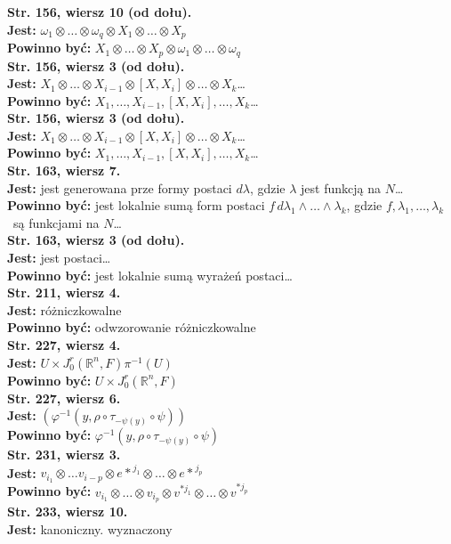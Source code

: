\documentclass[a4paper,11pt]{article}
\newcommand{\mb}{\mathbb}
\newcommand{\ld}{\ldots}
\newcommand{\ti}{\times}
\newcommand{\ot}{\otimes}
\newcommand{\we}{\wedge}
\newcommand{\vp}{\varphi}
\newcommand{\la}{\lambda}
\newcommand{\om}{\omega}
\newcommand{\R}{\mb{R}}
\newcommand{\tb}{\textbf}
\newcommand{\StrWg}[2]{\tb{Str. #1, wiersz #2.}}
\newcommand{\StrWd}[2]{\tb{Str. #1, wiersz #2 (od dołu).}}
\newcommand{\Jest}{\tb{Jest: }}
\newcommand{\Pow}{\tb{Powinno być: }}
\begin{document}
\StrWd{156}{10} \\
\Jest $\om_{ 1 } \ot \ld \ot \om_{ q } \ot X_{ 1 } \ot \ld
\ot X_{ p }$ \\
\Pow $X_{ 1 } \ot \ld \ot X_{ p } \ot \om_{ 1 } \ot \ld \ot
\om_{ q }$ \\
\StrWd{156}{3} \\
\Jest $X_{ 1 } \ot \ld \ot X_{ i - 1 } \ot [ X, X_{ i } ] \ot \ld
\ot X_{ k }$\ld \\
\Pow $X_{ 1 }, \ld, X_{ i - 1 }, [ X, X_{ i } ], \ld, X_{ k }$\ldots \\
\StrWd{156}{3} \\
\Jest $X_{ 1 } \ot \ld \ot X_{ i - 1 } \ot [ X, X_{ i } ] \ot \ld
\ot X_{ k }$\ld \\
\Pow $X_{ 1 }, \ld, X_{ i - 1 }, [ X, X_{ i } ], \ld, X_{ k }$\ld \\
\StrWg{163}{7} \\
\Jest jest generowana prze formy postaci $d \la$, gdzie $\la$
jest funkcją na $N$\ld \\
\Pow jest lokalnie sumą form postaci
$f\, d\la_{ 1 } \we \ldots \we \la_{ k }$, gdzie
$f, \la_{ 1 }, \ld, \la_{ k }$~są funkcjami na $N$\ld \\
\StrWd{163}{3} \\
\Jest jest postaci\ldots \\
\Pow  jest lokalnie sumą wyrażeń postaci\ld \\
\StrWg{211}{4} \\
\Jest różniczkowalne \\
\Pow  odwzorowanie różniczkowalne \\
\StrWg{227}{4} \\
\Jest $U \ti J^{ r }_{ 0 }( \R^{ n }, F ) \pi^{ -1 }( U )$ \\
\Pow  $U \ti J^{ r }_{ 0 }( \R^{ n }, F )$ \\
\StrWg{227}{6} \\
\Jest $( \vp^{ -1 }( y, \rho \circ \tau_{ -\psi( y ) } \circ \psi ) )$ \\
\Pow  $\vp^{ -1 }( y, \rho \circ \tau_{ -\psi( y ) } \circ \psi )$ \\
\StrWg{231}{3} \\
\Jest $v_{ i_{ 1 } } \ot \ld v_{ i - p } \ot { e* }^{ j_{ 1 } } \ot
\ld \ot { e* }^{ j_{ p } }$ \\
\Pow $v_{ i_{ 1 } } \ot \ld \ot v_{ i_{ p } } \ot v^{ * j_{ 1 } } \ot
\ld \ot v^{ * j_{ p } }$ \\
\StrWg{233}{10} \\
\Jest kanoniczny. wyznaczony \\
\end{document}
